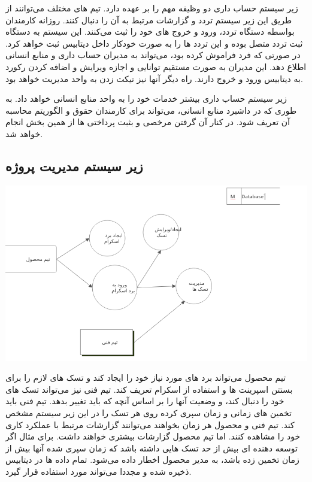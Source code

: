 زیر سیستم حساب داری دو وظیفه مهم را بر عهده دارد. تیم های مختلف می‌توانند از طریق این زیر سیستم تردد و گزارشات مرتبط به آن را دنبال کنند.
روزانه کارمندان بواسطه دستگاه تردد، ورود و خروج های خود را ثبت می‌کنند.
این سیستم به دستگاه ثبت تردد متصل بوده و این تردد ها را به صورت خودکار داخل دیتابیس ثبت خواهد کرد.
در صورتی که فرد فراموش کرده بود، می‌تواند به مدیران حساب داری و منابع انسانی اطلاع دهد. این مدیران به صورت مستقیم
توانایی و اجازه ویرایش و اضافه کردن رکورد به دیتابیس ورود و خروج دارند.
راه دیگر آنها نیز تیکت زدن به واحد مدیریت خواهد بود.

زیر سیستم حساب داری بیشتر خدمات خود را به واحد منابع انسانی خواهد داد. به طوری که در داشبرد منابع انسانی، می‌تواند برای کارمندان
حقوق و الگوریتم محاسبه آن تعریف شود. در کنار آن گرفتن مرخصی و بثبت پرداختی ها از همین بخش انجام خواهد شد.

\subsection{زیر سیستم مدیریت پروژه}
\includegraphics[scale=0.8]{assets/product_dfd.png}

تیم محصول می‌تواند برد های مورد نیاز خود را ایجاد کند و تسک های لازم را برای بستتن اسپرینت ها و استفاده از اسکرام تعریف کند.
تیم فنی نیز می‌تواند تسک های خود را دنبال کند، و وضعیت آنها را بر اساس آنچه که باید تغییر بدهد. تیم فنی باید تخمین های زمانی و زمان سپری کرده روی هر تسک را 
در این زیر سیستم مشخص کند.
تیم فنی و محصول هر  زمان بخواهند می‌توانند گزارشات مرتبط با عملکرد کاری خود را مشاهده کنند.
اما تیم محصول گزارشات بیشتری خواهند داشت.
برای مثال اگر توسعه دهنده ای بیش از حد تسک هایی داشته باشد که زمان سپری شده آنها بیش از زمان تخمین زده باشد، به مدیر محصول اخطار داده می‌شود.
تمام داده ها در دیتابیس ذخیره شده و مجددا می‌تواند مورد استفاده قرار گیرد.

